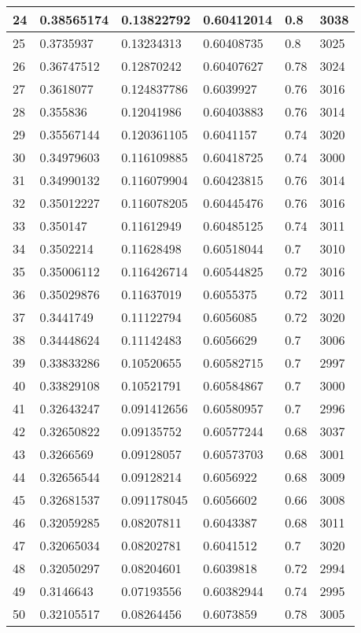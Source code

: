 \begin{longtable}{|l|l|l|l|l|l|}
24 & 0.38565174 & 0.13822792 & 0.60412014 & 0.8 & 3038 \\ \hline 
25 & 0.3735937 & 0.13234313 & 0.60408735 & 0.8 & 3025 \\ \hline 
26 & 0.36747512 & 0.12870242 & 0.60407627 & 0.78 & 3024 \\ \hline 
27 & 0.3618077 & 0.124837786 & 0.6039927 & 0.76 & 3016 \\ \hline 
28 & 0.355836 & 0.12041986 & 0.60403883 & 0.76 & 3014 \\ \hline 
29 & 0.35567144 & 0.120361105 & 0.6041157 & 0.74 & 3020 \\ \hline 
30 & 0.34979603 & 0.116109885 & 0.60418725 & 0.74 & 3000 \\ \hline 
31 & 0.34990132 & 0.116079904 & 0.60423815 & 0.76 & 3014 \\ \hline 
32 & 0.35012227 & 0.116078205 & 0.60445476 & 0.76 & 3016 \\ \hline 
33 & 0.350147 & 0.11612949 & 0.60485125 & 0.74 & 3011 \\ \hline 
34 & 0.3502214 & 0.11628498 & 0.60518044 & 0.7 & 3010 \\ \hline 
35 & 0.35006112 & 0.116426714 & 0.60544825 & 0.72 & 3016 \\ \hline 
36 & 0.35029876 & 0.11637019 & 0.6055375 & 0.72 & 3011 \\ \hline 
37 & 0.3441749 & 0.11122794 & 0.6056085 & 0.72 & 3020 \\ \hline 
38 & 0.34448624 & 0.11142483 & 0.6056629 & 0.7 & 3006 \\ \hline 
39 & 0.33833286 & 0.10520655 & 0.60582715 & 0.7 & 2997 \\ \hline 
40 & 0.33829108 & 0.10521791 & 0.60584867 & 0.7 & 3000 \\ \hline 
41 & 0.32643247 & 0.091412656 & 0.60580957 & 0.7 & 2996 \\ \hline 
42 & 0.32650822 & 0.09135752 & 0.60577244 & 0.68 & 3037 \\ \hline 
43 & 0.3266569 & 0.09128057 & 0.60573703 & 0.68 & 3001 \\ \hline 
44 & 0.32656544 & 0.09128214 & 0.6056922 & 0.68 & 3009 \\ \hline 
45 & 0.32681537 & 0.091178045 & 0.6056602 & 0.66 & 3008 \\ \hline 
46 & 0.32059285 & 0.08207811 & 0.6043387 & 0.68 & 3011 \\ \hline 
47 & 0.32065034 & 0.08202781 & 0.6041512 & 0.7 & 3020 \\ \hline 
48 & 0.32050297 & 0.08204601 & 0.6039818 & 0.72 & 2994 \\ \hline 
49 & 0.3146643 & 0.07193556 & 0.60382944 & 0.74 & 2995 \\ \hline 
50 & 0.32105517 & 0.08264456 & 0.6073859 & 0.78 & 3005 \\ \hline 
\end{longtable}